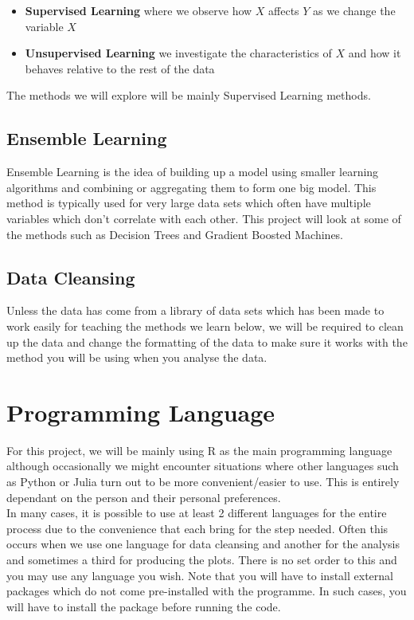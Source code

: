 \documentclass[11pt,a4paper]{report}
\begin{document}
\begin{itemize}
  \item \textbf{Supervised Learning} where we observe how $X$ affects $Y$ as we change the variable $X$
  
  \item \textbf{Unsupervised Learning} we investigate the characteristics of $X$ and how it behaves relative to the rest of the data
\end{itemize}
The methods we will explore will be mainly Supervised Learning methods.

\subsection{Ensemble Learning}
Ensemble Learning is the idea of building up a model using smaller learning algorithms and combining or aggregating them to form one big model. This method is typically used for very large data sets which often have multiple variables which don't correlate with each other. This project will look at some of the methods such as Decision Trees and Gradient Boosted Machines.

\subsection{Data Cleansing}
Unless the data has come from a library of data sets which has been made to work easily for teaching the methods we learn below, we will be required to clean up the data and change the formatting of the data to make sure it works with the method you will be using when you analyse the data. 

\section{Programming Language}
For this project, we will be mainly using R as the main programming language although occasionally we might encounter situations where other languages such as Python or Julia turn out to be more convenient/easier to use. This is entirely dependant on the person and their personal preferences.\\
\bigskip
In many cases, it is possible to use at least 2 different languages for the entire process due to the convenience that each bring for the step needed. Often this occurs when we use one
language for data cleansing and another for the analysis and sometimes a third for producing the plots. There is no set order to this and you may use any language you wish.
Note that you will have to install external packages which do not come pre-installed with the programme. In such cases, you will have to install the package before running the code.
\end{document}
